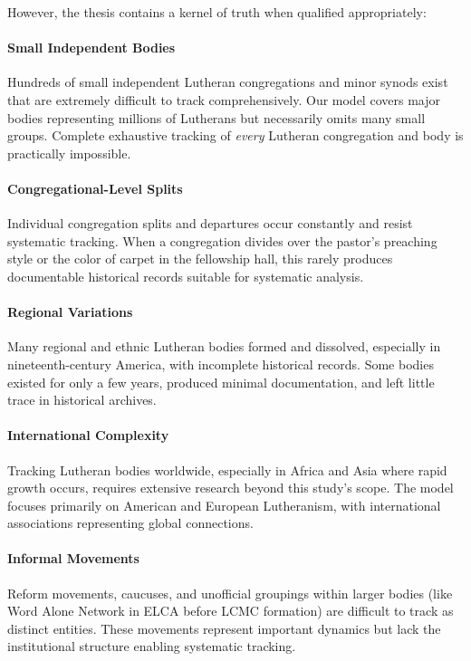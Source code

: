 However, the thesis contains a kernel of truth when qualified appropriately:

\paragraph{Small Independent Bodies} Hundreds of small independent Lutheran congregations and minor synods exist that are extremely difficult to track comprehensively. Our model covers major bodies representing millions of Lutherans but necessarily omits many small groups. Complete exhaustive tracking of \textit{every} Lutheran congregation and body is practically impossible.

\paragraph{Congregational-Level Splits} Individual congregation splits and departures occur constantly and resist systematic tracking. When a congregation divides over the pastor's preaching style or the color of carpet in the fellowship hall, this rarely produces documentable historical records suitable for systematic analysis.

\paragraph{Regional Variations} Many regional and ethnic Lutheran bodies formed and dissolved, especially in nineteenth-century America, with incomplete historical records. Some bodies existed for only a few years, produced minimal documentation, and left little trace in historical archives.

\paragraph{International Complexity} Tracking Lutheran bodies worldwide, especially in Africa and Asia where rapid growth occurs, requires extensive research beyond this study's scope. The model focuses primarily on American and European Lutheranism, with international associations representing global connections.

\paragraph{Informal Movements} Reform movements, caucuses, and unofficial groupings within larger bodies (like Word Alone Network in ELCA before LCMC formation) are difficult to track as distinct entities. These movements represent important dynamics but lack the institutional structure enabling systematic tracking.

